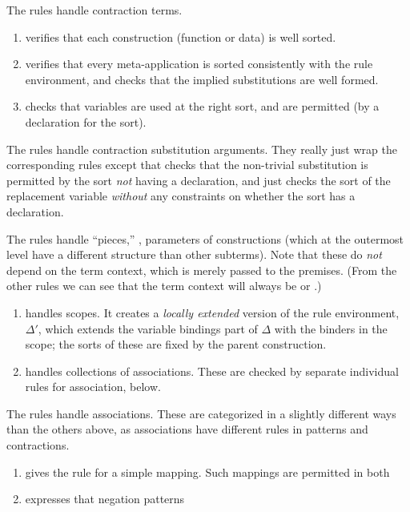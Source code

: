 \documentclass[letterpaper,10pt]{proc}
\begin{document}
The  rules handle contraction terms.
\begin{enumerate}

\item {} verifies that each construction (function or data) is well sorted.

\item {} verifies that every meta-application is sorted consistently with the rule
  environment, and checks that the implied substitutions are well formed.

\item {} checks that variables are used at the right sort, and are permitted (by a
   declaration for the sort).

\end{enumerate}

The  rules handle contraction substitution arguments. They really just wrap the
corresponding  rules except that  checks that the
non-trivial substitution is permitted by the sort \emph{not} having a  declaration,
and  just checks the sort of the replacement variable \emph{without} any
constraints on whether the sort has a  declaration.

The  rules handle ``pieces,'' \ie, parameters of constructions (which at the
outermost level have a different structure than other subterms). Note that these do \emph{not}
depend on the term context, which is merely passed to the premises. (From the other rules we can
see that the term context will always be  or .)
\begin{enumerate}

\item {} handles scopes. It creates a \emph{locally extended} version of the rule
  environment, $Δ'$, which extends the variable bindings part of $Δ$ with the binders in the
  scope; the sorts of these are fixed by the parent construction.

\item {} handles collections of associations. These are checked by separate
  individual rules for association, below.

\end{enumerate}

The  rules handle associations. These are categorized in a slightly different ways
than the others above, as associations have different rules in patterns and contractions.
\begin{enumerate}

\item {} gives the rule for a simple mapping. Such mappings are permitted in both 

\item {} expresses that negation patterns

\end{enumerate}
\end{document}
